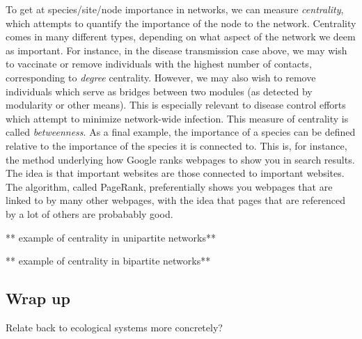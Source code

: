 \documentclass[12pt]{article}
\begin{document}
To get at species/site/node importance in networks, we can measure \textit{centrality}, which attempts to quantify the importance of the node to the network. Centrality comes in many different types, depending on what aspect of the network we deem as important. For instance, in the disease transmission case above, we may wish to vaccinate or remove individuals with the highest number of contacts, corresponding to \textit{degree} centrality. However, we may also wish to remove individuals which serve as bridges between two modules (as detected by modularity or other means). This is especially relevant to disease control efforts which attempt to minimize network-wide infection. This measure of centrality is called \textit{betweenness}. As a final example, the importance of a species can be defined relative to the importance of the species it is connected to. This is, for instance, the method underlying how Google ranks webpages to show you in search results. The idea is that important websites are those connected to important websites. The algorithm, called PageRank, preferentially shows you webpages that are linked to by many other webpages, with the idea that pages that are referenced by a lot of others are probabably good. 


** example of centrality in unipartite networks**



** example of centrality in bipartite networks**











\bigskip
\subsection*{Wrap up}

Relate back to ecological systems more concretely? 
\end{document}
